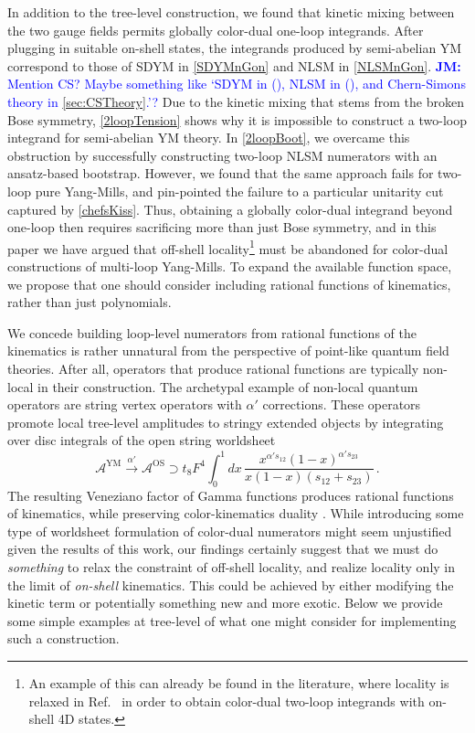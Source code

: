 \documentclass[11pt,letter]{article}
\newcommand{\jm}[1]{\textcolor{blue}{\textbf{JM: }{#1}}}
\def\be{\begin{equation}}
\def\ee{\end{equation}}
\begin{document}
In addition to the tree-level construction, we found that kinetic mixing
between the two gauge fields permits globally color-dual one-loop
integrands. After plugging in suitable on-shell states, the integrands
produced by semi-abelian YM correspond to those of SDYM in \cref{SDYMnGon} 
and NLSM in \cref{NLSMnGon}.  \jm{Mention CS?  Maybe something like `SDYM in (), NLSM in (), and Chern-Simons theory in \cref{sec:CSTheory}.'?}  Due to the
kinetic mixing that stems from the broken Bose symmetry, \cref{2loopTension} shows why it is
impossible to construct a two-loop integrand for semi-abelian YM theory. In \cref{2loopBoot}, we overcame this obstruction by successfully constructing two-loop NLSM numerators with an ansatz-based bootstrap. However, we found that the same approach fails for two-loop pure Yang-Mills, and pin-pointed the failure to a particular unitarity cut captured by \cref{chefsKiss}. Thus, obtaining a globally color-dual
integrand beyond one-loop then requires sacrificing more than just Bose
symmetry, and in this paper we have argued that off-shell locality\footnote{An example of this can already be found in the literature, where locality is relaxed in Ref.~\cite{Mogull:2015adi} in
  order to obtain color-dual two-loop integrands with on-shell 4D states.} must
be abandoned for color-dual constructions of multi-loop Yang-Mills. To expand the available function space, we propose that one should consider including rational functions of kinematics, rather than just polynomials.

We concede building loop-level numerators from rational functions of the kinematics
is rather unnatural from the perspective of point-like quantum field
theories. After all, operators that produce rational functions are typically non-local in their construction. The archetypal example of non-local quantum operators are string vertex operators with $\alpha'$ corrections. These operators promote local tree-level amplitudes to stringy extended objects by integrating over disc integrals of the open string worldsheet
\be
\mathcal{A}^{\text{YM}} \stackrel{\alpha'}{\longrightarrow} \mathcal{A}^{\text{OS}}\supset t_8 F^4 \int_0^1 dx \,\frac{ x^{\alpha' s_{12}}(1-x)^{\alpha' s_{23}}}{x(1-x)(s_{12}+s_{23})}\, .
\ee
The resulting Veneziano factor of Gamma functions produces rational functions of kinematics, while preserving color-kinematics duality \cite{MafraBCJAmplString,Broedel:2013tta,Mafra:2016mcc,Carrasco:2019yyn}. While introducing some type of worldsheet formulation of color-dual numerators might seem unjustified given the results of this work, our findings certainly suggest that we must do \textit{something} to relax the constraint of off-shell locality, and realize locality only in the limit of
\textit{on-shell} kinematics. This could be achieved by either modifying the kinetic term or potentially something new and more exotic. Below we provide some simple examples
at tree-level of what one might consider for implementing such a construction.
\end{document}
